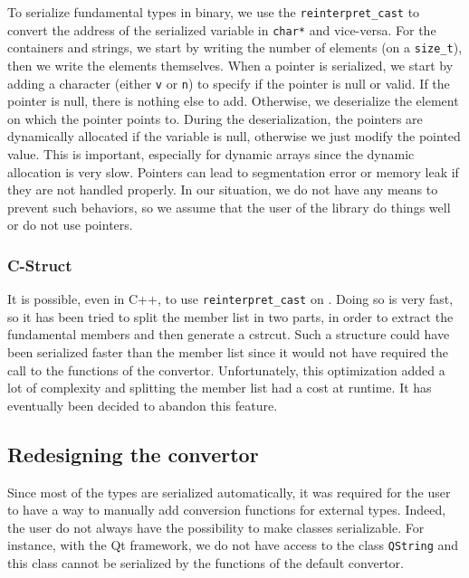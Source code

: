 To serialize fundamental types in binary, we use the \texttt{reinterpret\_cast}
to convert the address of the serialized variable in \texttt{char*} and
vice-versa. For the containers and strings, we start by writing the number of
elements (on a \texttt{size\_t}), then we write the elements themselves. When a
pointer is serialized, we start by adding a character (either \texttt{v} or
\texttt{n}) to specify if the pointer is null or valid. If the pointer is null,
there is nothing else to add. Otherwise, we deserialize the element on which the
pointer points to. During the deserialization, the pointers are dynamically
allocated if the variable is null, otherwise we just modify the pointed value.
This is important, especially for dynamic arrays since the dynamic allocation is
very slow. Pointers can lead to segmentation error or memory leak if they are
not handled properly. In our situation, we do not have any means to prevent such
behaviors, so we assume that the user of the library do things well or do not
use pointers.

\subsubsection{C-Struct}

It is possible, even in C++, to use \texttt{reinterpret\_cast} on
. Doing so is very fast, so it has been tried to split the member
list in two parts, in order to extract the fundamental members and then generate
a \gls{cstrcut}. Such a structure could have been serialized faster than the
member list since it would not have required the call to the functions of the
convertor. Unfortunately, this optimization added a lot of complexity and
splitting the member list had a cost at runtime. It has eventually been decided
to abandon this feature.

\subsection{Redesigning the convertor}
\label{sec:convertor}

Since most of the types are serialized automatically, it was required for the
user to have a way to manually add conversion functions for external types.
Indeed, the user do not always have the possibility to make classes
serializable. For instance, with the Qt framework, we do not have access to the
class \texttt{QString} and this class cannot be serialized by the functions of
the default convertor.

